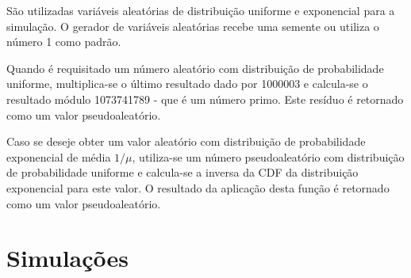\documentclass[a4paper,10pt]{article}
\begin{document}
São utilizadas variáveis aleatórias de distribuição uniforme e exponencial para a simulação. O gerador de variáveis aleatórias recebe uma semente ou utiliza o número 1 como padrão.

Quando é requisitado um número aleatório com distribuição de probabilidade uniforme, multiplica-se o último resultado dado por 1000003 e calcula-se o resultado módulo 1073741789 - que é um número primo. Este resíduo é retornado como um valor pseudoaleatório.

Caso se deseje obter um valor aleatório com distribuição de probabilidade exponencial de média $1 / \mu$, utiliza-se um número pseudoaleatório com distribuição de probabilidade uniforme e calcula-se a inversa da CDF da distribuição exponencial para este valor. O resultado da aplicação desta função é retornado como um valor pseudoaleatório.

\section{Simulações}
\end{document}
